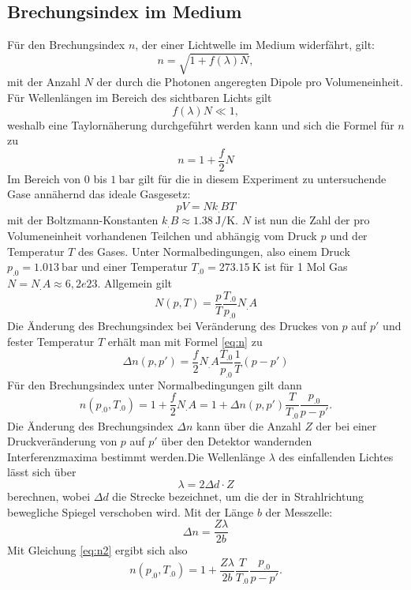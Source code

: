 \subsection{Brechungsindex im Medium}
Für den Brechungsindex $n$, der einer Lichtwelle im Medium widerfährt, gilt:
\begin{equation*}
n= \sqrt{1+f(\lambda)N},
\end{equation*}
mit der Anzahl $N$ der durch die Photonen angeregten Dipole pro Volumeneinheit.\newline
Für Wellenlängen im Bereich des sichtbaren Lichts gilt
\[
f(\lambda)N\ll 1,
\]
weshalb eine Taylornäherung durchgeführt werden kann und sich die Formel für $n$ zu 
\begin{equation}
n= 1+\frac{f}{2}N\label{eq:n}
\end{equation}
Im Bereich von $0$ bis $\SI{1}{\bar}$ gilt für die in diesem Experiment zu untersuchende Gase annähernd das ideale Gasgesetz:
\[
pV=Nk_.BT
\]
mit der Boltzmann-Konstanten $k_.B\approx\SI{1,38}{\joule\per\kelvin}$.
$N$ ist nun die Zahl der pro Volumeneinheit vorhandenen Teilchen und abhängig vom Druck $p$ und der Temperatur $T$ des Gases.
Unter Normalbedingungen, also einem Druck $p_.0=\SI{1,013}{\bar}$ und einer Temperatur $T_.0=\SI{273,15}{\kelvin}$ ist für 1 Mol Gas $N=N_.A\approx 6,2e23$.\newline
Allgemein gilt
\[
N(p,T)=\frac{p}{T}\frac{T_.0}{p_.0}N_.A
\]
Die Änderung des Brechungsindex bei Veränderung des Druckes von $p$ auf $p'$ und fester Temperatur $T$ erhält man mit Formel \eqref{eq:n} zu
\begin{equation}
\Delta n(p,p')=\frac{f}{2}N_.A\frac{T_.0}{p_.0}\frac{1}{T}(p-p')\label{eq:dn}
\end{equation}
Für den Brechungsindex unter Normalbedingungen gilt dann 
\begin{equation}
n(p_.0,T_.0)=1+\frac{f}{2}N_.A=1+\Delta n(p,p')\frac{T}{T_.0}\frac{p_.0}{p-p'}\text{.}\label{eq:n2}
\end{equation} 
Die Änderung des Brechungsindex $\Delta n$ kann über die Anzahl $Z$ der bei einer Druckveränderung von $p$ auf $p'$ über den Detektor wandernden Interferenzmaxima bestimmt werden.\newline Die Wellenlänge $\lambda$ des einfallenden Lichtes lässt sich über 
\begin{equation}
\lambda = 2\Delta d\cdot Z\label{eq:lambda}
\end{equation}
berechnen, wobei $\Delta d$ die Strecke bezeichnet, um die der in Strahlrichtung bewegliche Spiegel verschoben wird. Mit der Länge $b$ der Messzelle:
\begin{equation}
\Delta n = \frac{Z\lambda}{2b}
\end{equation}
Mit Gleichung \eqref{eq:n2} ergibt sich also
\begin{equation}
n(p_.0,T_.0)=1+\frac{Z\lambda}{2b}\frac{T}{T_.0}\frac{p_.0}{p-p'}\text{.}\label{eq:n3}
\end{equation}